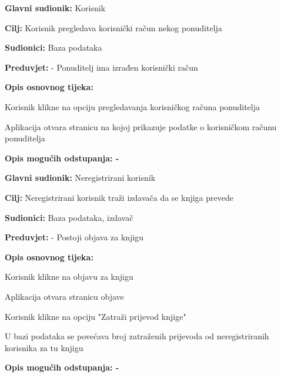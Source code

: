                     \noindent {}
					\begin{packed_item}
	
						\item \textbf{Glavni sudionik: } Korisnik
						\item  \textbf{Cilj:} Korisnik pregledava korisnički račun nekog ponuditelja
						\item  \textbf{Sudionici:} Baza podataka
						\item  \textbf{Preduvjet:} - Ponuditelj ima izrađen korisnički račun
						\item  \textbf{Opis osnovnog tijeka:}
						
						\item[] \begin{packed_enum}
	
							\item Korisnik klikne na opciju pregledavanja korisničkog računa ponuditelja
                            					\item Aplikacija otvara stranicu na kojoj prikazuje podatke o korisničkom računu ponuditelja
						\end{packed_enum}
						
						\item  \textbf{Opis mogućih odstupanja: -}
					\end{packed_item}

                    \noindent {}
					\begin{packed_item}
	
						\item \textbf{Glavni sudionik: } Neregistrirani korisnik
						\item  \textbf{Cilj:} Neregistrirani korisnik traži izdavača da se knjiga prevede
						\item  \textbf{Sudionici:} Baza podataka, izdavač
						\item  \textbf{Preduvjet:} - Postoji objava za knjigu
						\item  \textbf{Opis osnovnog tijeka:}
						
						\item[] \begin{packed_enum}
	
							\item Korisnik klikne na objavu za knjigu
                            					\item Aplikacija otvara stranicu objave 
							\item Korisnik klikne na opciju "Zatraži prijevod knjige"
                            					\item U bazi podataka se povećava broj zatraženih prijevoda od neregistriranih korisnika za tu knjigu
						\end{packed_enum}
						
						\item  \textbf{Opis mogućih odstupanja: -}
					\end{packed_item}


